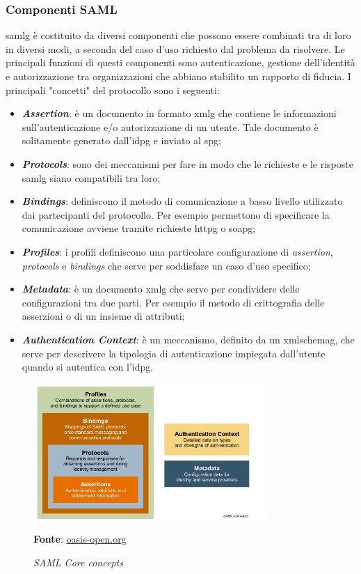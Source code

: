 \subsubsection{Componenti SAML}
\gls{samlg} è costituito da diversi componenti che possono essere combinati tra di loro in diversi modi, a seconda del caso d'uso richiesto dal problema da risolvere. Le principali funzioni di questi componenti sono autenticazione, gestione dell'identità e autorizzazione tra organizzazioni che abbiano stabilito un rapporto di fiducia. I principali "concetti" del protocollo sono i seguenti:
\begin{itemize}
    \item \textit{\textbf{Assertion}}: è un documento in formato \gls{xmlg} che contiene le informazioni sull'autenticazione e/o autorizzazione di un utente. Tale documento è solitamente generato dall'\gls{idpg} e inviato al \gls{spg};
    \item \textit{\textbf{Protocols}}: sono dei meccanismi per fare in modo che le richieste e le risposte \gls{samlg} siano compatibili tra loro;
    \item \textit{\textbf{Bindings}}: definiscono il metodo di comunicazione a basso livello utilizzato dai partecipanti del protocollo. Per esempio permettono di specificare la comunicazione avviene tramite richieste \gls{httpg} o \gls{soapg};
    \item \textit{\textbf{Profiles}}: i profili definiscono una particolare configurazione di \textit{assertion}, \textit{protocols} e \textit{bindings} che serve per soddisfare un caso d'uso specifico;
    \item \textit{\textbf{Metadata}}: è un documento \gls{xmlg} che serve per condividere delle configurazioni tra due parti. Per esempio il metodo di crittografia delle asserzioni o di un insieme di attributi;
    \item \textit{\textbf{Authentication Context}}: è un meccanismo, definito da un \gls{xmlschemag}, che serve per descrivere la tipologia di autenticazione impiegata dall'utente quando si autentica con l'\gls{idpg}.
\end{itemize}

\newpage

    \begin{figure}[ht]
        \centering
        \includegraphics[width=0.8\textwidth]{immagini/SAMLCore.png}
        \caption{\textit{SAML Core concepts}}
        \textbf{Fonte}:
        \href{https://www.oasis-open.org/committees/download.php/27819/sstc-saml-tech-overview-2.0-cd-02.pdf}{oasis-open.org}
        \label{fig: SAML core}
    \end{figure}

